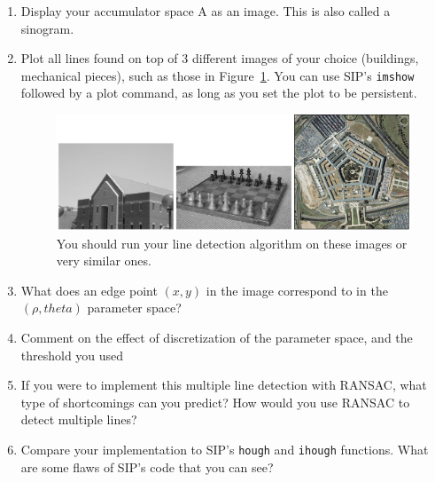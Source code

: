 \documentclass[a4paper]{article}
\begin{document}
\begin{enumerate}
\item Display your accumulator space A as an image. This is also called a
sinogram.
\item Plot all lines found on top of 3 different images of your choice
(buildings, mechanical pieces), such as those in
Figure~\ref{fig:line:hough:imgs}. You can use SIP's \texttt{imshow} followed by a
plot command, as long as you set the plot to be persistent.
\begin{figure}
\centering
\includegraphics[width=\linewidth]{figs/images-for-line-hough.png}%
\caption{%
You should run your line detection algorithm on these images or very similar ones.
}\label{fig:line:hough:imgs}
\end{figure}
\item What does an edge point $(x,y)$ in the image correspond to in the $(\rho,
theta)$ parameter space?
\item Comment on the effect of discretization of the parameter space, and the
threshold you used
\item If you were to implement this multiple line detection with RANSAC, what type of shortcomings can
you predict? How would you use RANSAC to detect multiple lines?
\item Compare your implementation to SIP's \texttt{hough} and \texttt{ihough}
functions. What are some flaws of SIP's code that you can see?
\end{enumerate}
\end{document}
